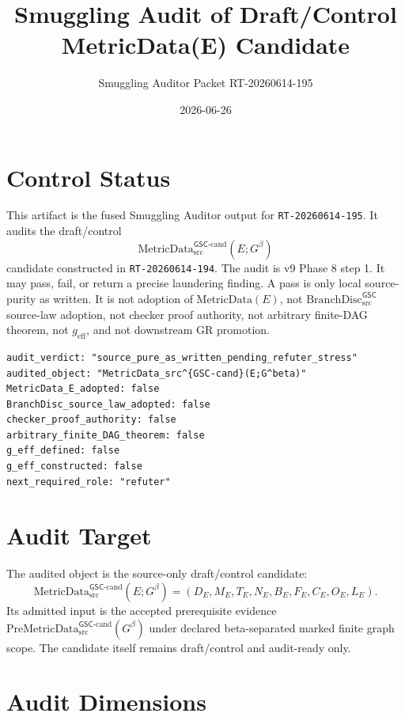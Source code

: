 \documentclass[11pt]{article}
\title{Smuggling Audit of Draft/Control MetricData(E) Candidate}
\author{Smuggling Auditor Packet RT-20260614-195}
\date{2026-06-26}
\newcommand{\MetricData}{\mathrm{MetricData}_{\mathrm{src}}^{\mathsf{GSC}\mbox{-}\mathrm{cand}}}
\newcommand{\PreMetricData}{\mathrm{PreMetricData}_{\mathrm{src}}^{\mathsf{GSC}\mbox{-}\mathrm{cand}}}
\newcommand{\BranchDisc}{\mathrm{BranchDisc}_{\mathrm{src}}^{\mathsf{GSC}}}
\newcommand{\Gbeta}{G^\beta}
\newcommand{\geff}{g_{\mathrm{eff}}}
\begin{document}
\maketitle

\section{Control Status}

This artifact is the fused Smuggling Auditor output for
\texttt{RT-20260614-195}. It audits the draft/control
\[
  \MetricData(E;\Gbeta)
\]
candidate constructed in \texttt{RT-20260614-194}. The audit is v9 Phase 8
step 1. It may pass, fail, or return a precise laundering finding. A pass is
only local source-purity as written. It is not adoption of
\(\mathrm{MetricData}(E)\), not \(\BranchDisc\) source-law adoption, not
checker proof authority, not arbitrary finite-DAG theorem, not \(\geff\), and
not downstream GR promotion.

\begin{verbatim}
audit_verdict: "source_pure_as_written_pending_refuter_stress"
audited_object: "MetricData_src^{GSC-cand}(E;G^beta)"
MetricData_E_adopted: false
BranchDisc_source_law_adopted: false
checker_proof_authority: false
arbitrary_finite_DAG_theorem: false
g_eff_defined: false
g_eff_constructed: false
next_required_role: "refuter"
\end{verbatim}

\section{Audit Target}

The audited object is the source-only draft/control candidate:
\[
  \MetricData(E;\Gbeta)=
  (D_E,M_E,T_E,N_E,B_E,F_E,C_E,O_E,L_E).
\]
Its admitted input is the accepted prerequisite evidence
\(\PreMetricData(\Gbeta)\) under declared beta-separated marked finite graph
scope. The candidate itself remains draft/control and audit-ready only.

\section{Audit Dimensions}
\end{document}
